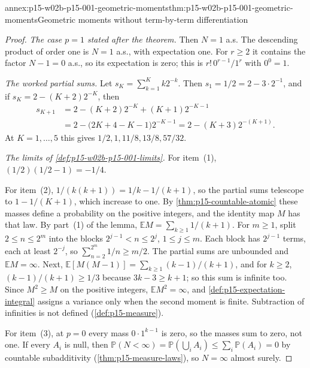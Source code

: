 \begin{annexitem}{annex:p15-w02b-p15-001-geometric-moments}{thm:p15-w02b-p15-001-geometric-moments}{Geometric moments without term-by-term differentiation}
\begin{proof}
\emph{The case \(p=1\) stated after the theorem.} Then \(N=1\) a.s.
The descending product of order one is \(N=1\) a.s., with expectation
one. For \(r\geq2\) it contains the factor \(N-1=0\) a.s., so its
expectation is zero; this is \(r!\,0^{r-1}/1^r\) with \(0^0=1\).

\emph{The worked partial sums.} Let
\(s_K=\sum_{k=1}^Kk2^{-k}\). Then \(s_1=1/2=2-3\cdot2^{-1}\), and if
\(s_K=2-(K+2)2^{-K}\), then
\[
 \begin{aligned}
 s_{K+1}&=2-(K+2)2^{-K}+(K+1)2^{-K-1}\\
        &=2-\bigl(2K+4-K-1\bigr)2^{-K-1}=2-(K+3)2^{-(K+1)}.
 \end{aligned}
\]
At \(K=1,\ldots,5\) this gives \(1/2,1,11/8,13/8,57/32\).

\emph{The limits of \cref{def:p15-w02b-p15-001-limits}.}
For item~(1), \((1/2)(1/2-1)=-1/4\).

For item~(2), \(1/(k(k+1))=1/k-1/(k+1)\), so the partial sums
telescope to \(1-1/(K+1)\), which increase to one. By
\cref{thm:p15-countable-atomic} these masses define a probability on
the positive integers, and the identity map \(M\) has that law. By part~(1)
of the lemma, \(\mathbb EM=\sum_{k\geq1}1/(k+1)\). For \(m\geq1\),
split \(2\leq n\leq2^m\) into the blocks \(2^{j-1}<n\leq2^j\),
\(1\leq j\leq m\). Each block has \(2^{j-1}\) terms, each at least
\(2^{-j}\), so \(\sum_{n=2}^{2^m}1/n\geq m/2\). The partial sums are
unbounded and \(\mathbb EM=\infty\). Next,
\(\mathbb E[M(M-1)]=\sum_{k\geq1}(k-1)/(k+1)\), and for \(k\geq2\),
\((k-1)/(k+1)\geq1/3\) because \(3k-3\geq k+1\); so this sum is
infinite too. Since \(M^2\geq M\) on the positive integers,
\(\mathbb EM^2=\infty\), and \cref{def:p15-expectation-integral}
assigns a variance only when the second moment is finite. Subtraction
of infinities is not defined (\cref{def:p15-measure}).

For item~(3), at \(p=0\) every mass \(0\cdot1^{k-1}\) is zero, so the
masses sum to zero, not one. If every \(A_i\) is null, then
\(\mathbb P(N<\infty)=\mathbb P(\bigcup_iA_i)\leq\sum_i\mathbb P(A_i)=0\)
by countable subadditivity (\cref{thm:p15-measure-laws}), so
\(N=\infty\) almost surely.
\end{proof}
\end{annexitem}

